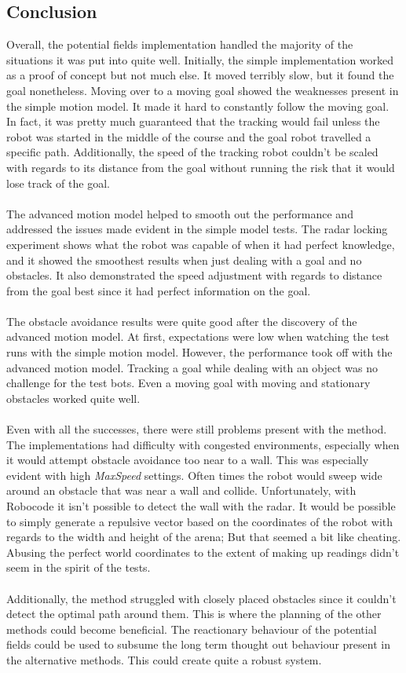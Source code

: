 \documentclass{aiaa-tc}%
\begin{document}
\subsection{Conclusion}
Overall, the potential fields implementation handled the majority of the situations it was put into quite well. Initially, the simple implementation worked as a proof of concept but not much else. It moved terribly slow, but it found the goal nonetheless. Moving over to a moving goal showed the weaknesses present in the simple motion model. It made it hard to constantly follow the moving goal. In fact, it was pretty much guaranteed that the tracking would fail unless the robot was started in the middle of the course and the goal robot travelled a specific path. Additionally, the speed of the tracking robot couldn't be scaled with regards to its distance from the goal without running the risk that it would lose track of the goal. \\ \\
The advanced motion model helped to smooth out the performance and addressed the issues made evident in the simple model tests. The radar locking experiment shows what the robot was capable of when it had perfect knowledge, and it showed the smoothest results when just dealing with a goal and no obstacles. It also demonstrated the speed adjustment with regards to distance from the goal best since it had perfect information on the goal. \\ \\
The obstacle avoidance results were quite good after the discovery of the advanced motion model. At first, expectations were low when watching the test runs with the simple motion model. However, the performance took off with the advanced motion model. Tracking a goal while dealing with an object was no challenge for the test bots. Even a moving goal with moving and stationary obstacles worked quite well. \\ \\
Even with all the successes, there were still problems present with the method. The implementations had difficulty with congested environments, especially when it would attempt obstacle avoidance too near to a wall. This was especially evident with high \emph{MaxSpeed} settings. Often times the robot would sweep wide around an obstacle that was near a wall and collide. Unfortunately, with Robocode it isn't possible to detect the wall with the radar. It would be possible to simply generate a repulsive vector based on the coordinates of the robot with regards to the width and height of the arena; But that seemed a bit like cheating. Abusing the perfect world coordinates to the extent of making up readings didn't seem in the spirit of the tests. \\ \\
Additionally, the method struggled with closely placed obstacles since it couldn't detect the optimal path around them. This is where the planning of the other methods could become beneficial. The reactionary behaviour of the potential fields could be used to subsume the long term thought out behaviour present in the alternative methods. This could create quite a robust system.
\end{document}
